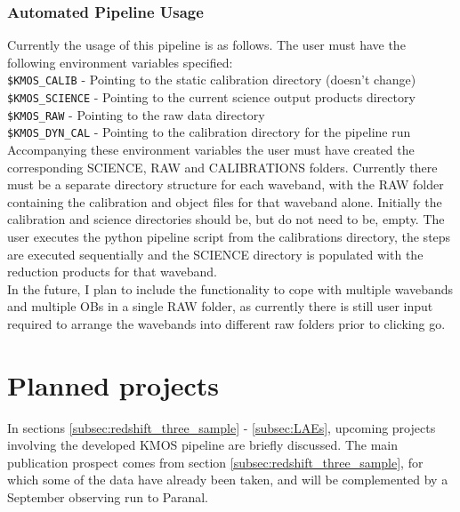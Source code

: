 \documentclass{literature}
\begin{document}
\subsubsection{Automated Pipeline Usage}
Currently the usage of this pipeline is as follows. The user must have the following environment variables specified: \\ 

\noindent
{\tt{\$KMOS\_CALIB}} - Pointing to the static calibration directory (doesn't change) \\
\noindent
{\tt{\$KMOS\_SCIENCE}} - Pointing to the current science output products directory \\
\noindent
{\tt{\$KMOS\_RAW}} - Pointing to the raw data directory \\
\noindent
{\tt{\$KMOS\_DYN\_CAL}} - Pointing to the calibration directory for the pipeline run \\

\noindent
Accompanying these environment variables the user must have created the corresponding SCIENCE, RAW and CALIBRATIONS folders. Currently there must be a separate directory structure for each waveband, with the RAW folder containing the calibration and object files for that waveband alone. Initially the calibration and science directories should be, but do not need to be, empty. The user executes the python pipeline script from the calibrations directory, the steps are executed sequentially and the SCIENCE directory is populated with the reduction products for that waveband. \\
In the future, I plan to include the functionality to cope with multiple wavebands and multiple OBs in a single RAW folder, as currently there is still user input required to arrange the wavebands into different raw folders prior to clicking go.   



\section{Planned projects}\label{sec:projects}
In sections \ref{subsec:redshift_three_sample} - \ref{subsec:LAEs}, upcoming projects involving the developed KMOS pipeline are briefly discussed. The main publication prospect comes from section \ref{subsec:redshift_three_sample}, for which some of the data have already been taken, and will be complemented by a September observing run to Paranal. 
\end{document}
